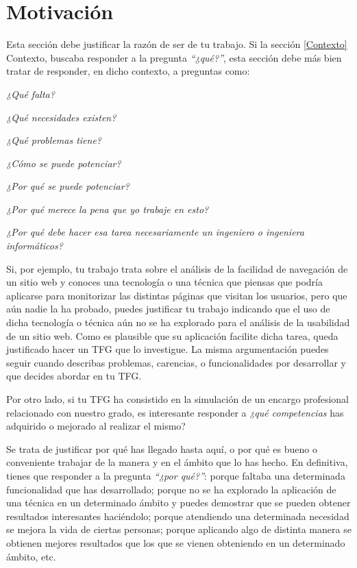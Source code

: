 \section{Motivación}\label{Motivation}
Esta sección debe justificar la razón de ser de tu trabajo. Si la sección \ref{Contexto} Contexto, buscaba responder a la pregunta \textit{``¿qué?''}, esta sección debe más bien tratar de responder, en dicho contexto, a preguntas como:
\begin{todolist}
    \item \textit{¿Qué falta?}
    \item \textit{¿Qué necesidades existen?}
    \item \textit{¿Qué problemas tiene?}
    \item \textit{¿Cómo se puede potenciar?}
    \item \textit{¿Por qué  se puede potenciar?}
    \item \textit{¿Por qué merece la pena que yo trabaje en esto?}
    \item \textit{¿Por qué debe hacer esa tarea necesariamente un ingeniero o ingeniera informáticos?}
\end{todolist} 

Si, por ejemplo, tu trabajo trata sobre el análisis de la facilidad de navegación de un sitio web y conoces una tecnología o una técnica que piensas que podría aplicarse para monitorizar las distintas páginas que visitan los usuarios, pero que aún nadie la ha probado, puedes justificar tu trabajo indicando que el uso de dicha tecnología o técnica aún no se ha explorado para el análisis de la usabilidad de un sitio web. Como es plausible que su aplicación facilite dicha tarea, queda justificado hacer un TFG que lo investigue. La misma argumentación puedes seguir cuando describas problemas, carencias, o funcionalidades por desarrollar y que decides abordar en tu TFG.

Por otro lado, si tu TFG ha consistido en la simulación de un encargo profesional relacionado con nuestro grado, es interesante responder a \textit{¿qué competencias} has adquirido o mejorado al realizar el mismo?

Se trata de justificar por qué has llegado hasta aquí, o por qué es bueno o conveniente trabajar de la manera y en el ámbito que lo has hecho. En definitiva, tienes que responder a la pregunta \textit{``¿por qué?''}: porque faltaba una determinada funcionalidad que has desarrollado; porque no se ha explorado la aplicación de una técnica en un determinado ámbito y puedes demostrar que se pueden obtener resultados interesantes haciéndolo; porque atendiendo una determinada necesidad se mejora la vida de ciertas personas; porque aplicando algo de distinta manera se obtienen mejores resultados que los que se vienen obteniendo en un determinado ámbito, etc.

